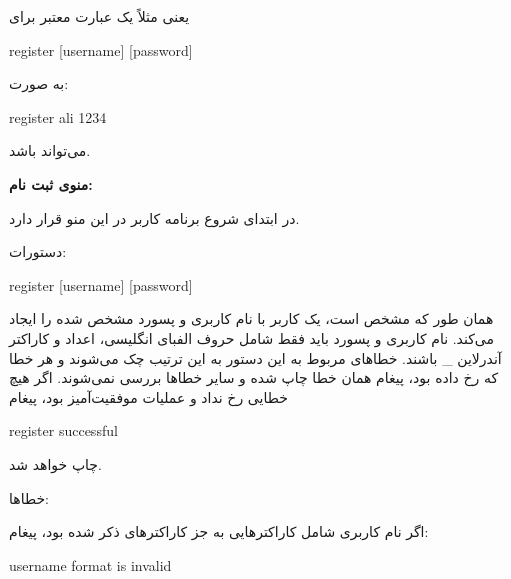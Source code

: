 \documentclass[]{article}
\begin{document}
یعنی مثلاً یک عبارت معتبر برای



\begin{tcolorbox}[boxrule=0pt]
	\begin{latin}
  	  \large{
  	  	register [username] [password]
		}
	\end{latin}
\end{tcolorbox}

به صورت:



\begin{tcolorbox}[boxrule=0pt]
	\begin{latin}
  	  \large{
  	  	register ali 1234
		}
	\end{latin}
\end{tcolorbox}

می‌تواند باشد.

\textbf{منوی ثبت نام:}

در ابتدای شروع برنامه کاربر در این منو قرار دارد.

دستورات:



\begin{tcolorbox}[boxrule=0pt]
	\begin{latin}
  	  \large{
  	  	register [username] [password]
		}
	\end{latin}
\end{tcolorbox}

همان طور که مشخص است، یک کاربر با نام کاربری و پسورد مشخص شده را ایجاد می‌کند. نام کاربری و پسورد باید فقط شامل حروف الفبای انگلیسی، اعداد و کاراکتر آندرلاین \_ باشند. خطاهای مربوط به این دستور به این ترتیب چک می‌شوند و هر خطا که رخ داده بود، پیغام همان خطا چاپ شده و سایر خطاها بررسی نمی‌شوند. اگر هیچ خطایی رخ نداد و عملیات موفقیت‌آمیز بود، پیغام



\begin{tcolorbox}[boxrule=0pt]
	\begin{latin}
  	  \large{
  	  	register successful
		}
	\end{latin}
\end{tcolorbox}

چاپ خواهد شد.

خطاها: 

اگر نام کاربری شامل کاراکترهایی به جز کاراکترهای ذکر شده بود، پیغام:



\begin{tcolorbox}[boxrule=0pt]
	\begin{latin}
  	  \large{
  	  	username format is invalid
		}
	\end{latin}
\end{tcolorbox}
\end{document}
